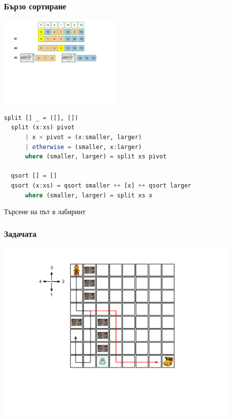 \documentclass{beamer}
\begin{document}
\begin{frame}[fragile]
  \frametitle{Бързо сортиране}

  \begin{center}
    \includegraphics[width=6cm]{images/qsort}
 \end{center}
   
\vspace*{-2cm}

\begin{lstlisting}[basicstyle=\small,language=Haskell]
  split [] _ = ([], [])
  split (x:xs) pivot 
      | x < pivot = (x:smaller, larger)
      | otherwise = (smaller, x:larger)
      where (smaller, larger) = split xs pivot
  
  qsort [] = []
  qsort (x:xs) = qsort smaller ++ [x] ++ qsort larger
      where (smaller, larger) = split xs x
  \end{lstlisting}
  

\end{frame}


\begin{frame}
  \centerline{Търсене на път в лабиринт}
\end{frame}



\begin{frame}[fragile]
  \frametitle{Задачата}
  \includegraphics[width=12cm]{images/lab_sol}
\end{frame}
\end{document}

